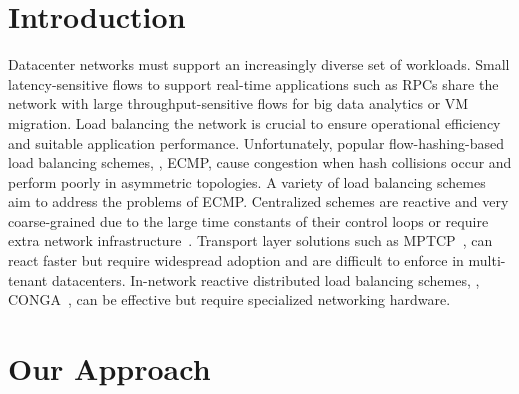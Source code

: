 \section{Introduction}
\label{section:intro}

Datacenter networks must support an increasingly diverse set of
workloads.
Small latency-sensitive flows to support real-time applications such
as RPCs share the network with large
throughput-sensitive flows for big data analytics or VM
migration.
Load balancing the network is crucial to ensure operational efficiency
and suitable application performance.
Unfortunately, popular flow-hashing-based load balancing schemes,
\eg{}, ECMP, cause congestion when hash collisions
occur and
perform poorly in asymmetric topologies.
A variety of load balancing schemes aim to address the
problems of ECMP. Centralized schemes
are reactive and very coarse-grained due to the large time constants of their control
loops or require extra network
infrastructure~\cite{planck}.
Transport layer solutions such as MPTCP~\cite{mptcp}, can
react faster but require widespread adoption and are difficult to
enforce in multi-tenant datacenters.
In-network reactive distributed load balancing schemes, \eg{},
CONGA~\cite{conga}, can be
effective but require specialized networking hardware.


\section{Our Approach}


